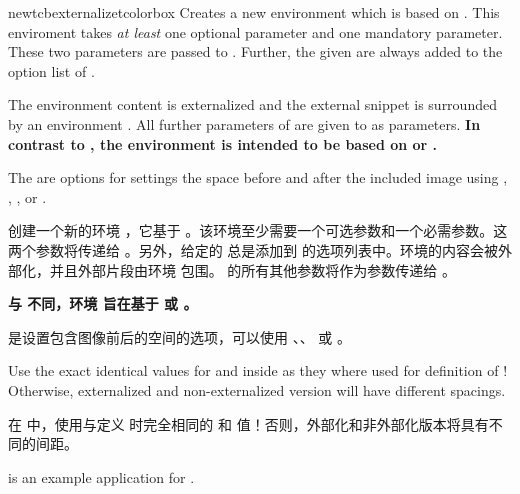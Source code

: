 \begin{docCommand}[doc new=2015-03-11]{newtcbexternalizetcolorbox}{}
  Creates a new environment  which is based on
  . This enviroment takes \emph{at least}
  one optional parameter and one mandatory parameter.
  These two parameters are passed to .
  Further, the given  are always added to the option list of .\par
  The environment content is externalized and the external snippet is surrounded
  by an environment . All further parameters of 
  are given to  as parameters.
  \textbf{In contrast to , the
  environment  is intended to be based on 
  or .}\par
  The  are options for settings the space before
  and after the included image using , ,
  , or .

  创建一个新的环境 ，它基于 。该环境至少需要一个可选参数和一个必需参数。这两个参数将传递给 。另外，给定的  总是添加到  的选项列表中。环境的内容会被外部化，并且外部片段由环境  包围。 的所有其他参数将作为参数传递给 。

  \textbf{与  不同，环境  旨在基于  或 。}

   是设置包含图像前后的空间的选项，可以使用 、、 或 。


  \begin{marker}
  Use the exact identical values for  and 
  inside  as they where used for definition of
  ! Otherwise, externalized and non-externalized version will have
  different spacings.

  在  中，使用与定义  时完全相同的  和  值！否则，外部化和非外部化版本将具有不同的间距。
  \end{marker}
   is an example application for .


\end{docCommand}
